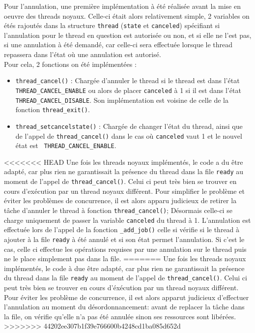 Pour l'annulation, une première implémentation à été réalisée avant la mise en oeuvre des threads noyaux. Celle-ci était alors relativement simple, 2 variables on étés rajoutés dans la structure \verb!thread! (\verb!state! et \verb!canceled!) spécifiant si l'annulation pour le thread en question est autorisée ou non, et si elle ne l'est pas, si une annulation à été demandé, car celle-ci sera effectuée lorsque le thread repassera dans l'état où une annulation est autorisé.\\

Pour cela, 2 fonctions on été implémentées :
\begin{itemize}
\item \verb!thread_cancel()! : Chargée d'annuler le thread si le thread est dans l'état\\ \verb!THREAD_CANCEL_ENABLE! ou alors de placer \verb!canceled! à 1 si il est dans l'état \verb!THREAD_CANCEL_DISABLE!. Son implémentation est voisine de celle de la fonction \verb!thread_exit()!.\\
\item \verb!thread_setcancelstate()! : Chargée de changer l'état du thread, ainsi que de l'appel de \verb!thread_cancel()! dans le cas où \verb!canceled! vaut 1 et le nouvel état est \verb! THREAD_CANCEL_ENABLE!.
\end{itemize}

<<<<<<< HEAD
Une fois les threads noyaux implémentés, le code a du être adapté, car plus rien ne garantissait la présence du thread dans la file \verb!ready! au moment de l'appel de \verb!thread_cancel()!. Celui ci peut très bien se trouver en cours d'exécution par un thread noyaux différent. Pour simplifier le problème et éviter les problèmes de concurrence, il est alors apparu judicieux de retirer la tâche d'annuler le thread à fonction \verb!thread_cancel()!; Désormais celle-ci se charge uniquement de passer la variable \verb!canceled! du thread à 1. L'annulation est effectuée lors de l'appel de la fonction \verb!_add_job()! celle si vérifie si le thread à ajouter à la file \verb!ready! à été annulé et si son état permet l'annulation. Si c'est le cas, celle ci effectue les opérations requises par une annulation sur le thread puis ne le place simplement pas dans la file.
=======
Une fois les threads noyaux implémentés, le code à due être adapté, car plus rien ne garantissait la présence du thread dans la file \verb!ready! au moment de l'appel de \verb!thread_cancel()!. Celui ci peut très bien se trouver en cours d'éxécution par un thread noyaux différent. Pour éviter les problème de concurrence, il est alors apparut judicieux d'effectuer l'annulation au moment du désordonnancement: avant de replacer la tâche dans la file, on vérifie qu'elle n'a pas été annulée sinon ses ressources sont libérées.
>>>>>>> 44202ee307b1f39e766600b4248cd1ba085d652d
